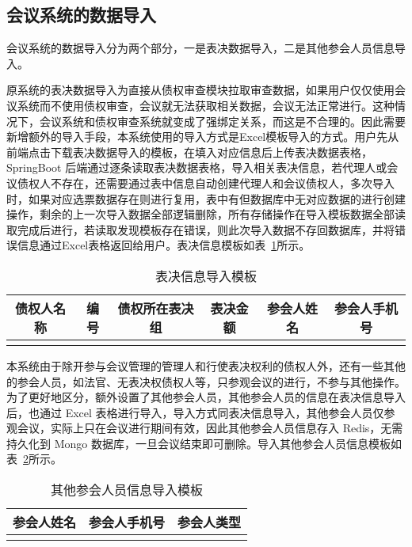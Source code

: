 \subsection{会议系统的数据导入}
会议系统的数据导入分为两个部分，一是表决数据导入，二是其他参会人员信息导入。

原系统的表决数据导入为直接从债权审查模块拉取审查数据，如果用户仅仅使用会议系统而不使用债权审查，会议就无法获取相关数据，会议无法正常进行。这种情况下，会议系统和债权审查系统就变成了强绑定关系，而这是不合理的。因此需要新增额外的导入手段，本系统使用的导入方式是Excel模板导入的方式。用户先从前端点击下载表决数据导入的模板，在填入对应信息后上传表决数据表格，SpringBoot 后端通过逐条读取表决数据表格，导入相关表决信息，若代理人或会议债权人不存在，还需要通过表中信息自动创建代理人和会议债权人，多次导入时，如果对应选票数据存在则进行复用，表中有但数据库中无对应数据的进行创建操作，剩余的上一次导入数据全部逻辑删除，所有存储操作在导入模板数据全部读取完成后进行，若读取发现模板存在错误，则此次导入数据不存回数据库，并将错误信息通过Excel表格返回给用户。表决信息模板如表~\ref{fig:meetingImport}所示。

\begin{table}[h!]
    \begin{center}
      \caption{表决信息导入模板}
      \label{fig:meetingImport}
      \begin{tabular}{c c c c c c }
        \hline
        \textbf{债权人名称} & \textbf{编号} & \textbf{债权所在表决组} & \textbf{表决金额} & \textbf{参会人姓名} & \textbf{参会人手机号} \\
        \hline
        \\
        \hline
      \end{tabular}
    \end{center}
  \end{table}

本系统由于除开参与会议管理的管理人和行使表决权利的债权人外，还有一些其他的参会人员，如法官、无表决权债权人等，只参观会议的进行，不参与其他操作。为了更好地区分，额外设置了其他参会人员，其他参会人员的信息在表决信息导入后，也通过 Excel 表格进行导入，导入方式同表决信息导入，其他参会人员仅参观会议，实际上只在会议进行期间有效，因此其他参会人员信息存入 Redis，无需持久化到 Mongo 数据库，一旦会议结束即可删除。导入其他参会人员信息模板如表~\ref{fig:otherUserImport}所示。

\begin{table}[h!]
    \begin{center}
      \caption{其他参会人员信息导入模板}
      \label{fig:otherUserImport}
      \begin{tabular}{ c c c }
        \hline
       \textbf{参会人姓名} & \textbf{参会人手机号} & \textbf{参会人类型} \\
       \hline
       \\
       \hline
      \end{tabular}
    \end{center}
  \end{table}

